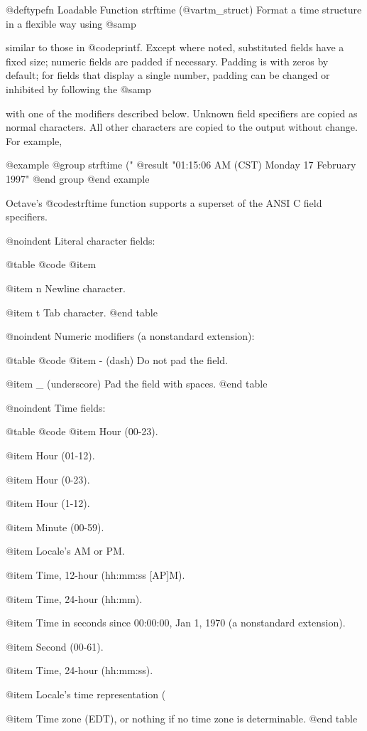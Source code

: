 @deftypefn {Loadable Function} {} strftime (@var{tm_struct})
Format a time structure in a flexible way using @samp{%
similar to those in @code{printf}.  Except where noted, substituted
fields have a fixed size; numeric fields are padded if necessary.
Padding is with zeros by default; for fields that display a single
number, padding can be changed or inhibited by following the @samp{%
with one of the modifiers described below.  Unknown field specifiers are
copied as normal characters.  All other characters are copied to the
output without change.  For example,

@example
@group
strftime ("%
     @result{} "01:15:06 AM (CST) Monday 17 February 1997"
@end group
@end example

Octave's @code{strftime} function supports a superset of the ANSI C
field specifiers.

@noindent
Literal character fields:

@table @code
@item %

@item n
Newline character.

@item t
Tab character.
@end table

@noindent
Numeric modifiers (a nonstandard extension):

@table @code
@item - (dash)
Do not pad the field.

@item _ (underscore)
Pad the field with spaces.
@end table

@noindent
Time fields:

@table @code
@item %
Hour (00-23).

@item %
Hour (01-12).

@item %
Hour (0-23).

@item %
Hour (1-12).

@item %
Minute (00-59).

@item %
Locale's AM or PM.

@item %
Time, 12-hour (hh:mm:ss [AP]M).

@item %
Time, 24-hour (hh:mm).

@item %
Time in seconds since 00:00:00, Jan 1, 1970 (a nonstandard extension).

@item %
Second (00-61).

@item %
Time, 24-hour (hh:mm:ss).

@item %
Locale's time representation (%

@item %
Time zone (EDT), or nothing if no time zone is determinable.
@end table

}}
